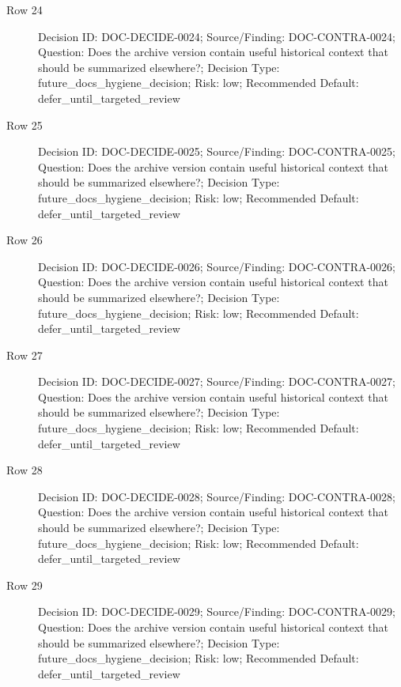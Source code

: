 \documentclass[9pt,a4paper,openany]{book}
\begin{document}
\begin{description}
\item[Row 24] Decision ID: DOC-\allowbreak{}DECIDE-\allowbreak{}0024; Source/\allowbreak{}Finding: DOC-\allowbreak{}CONTRA-\allowbreak{}0024; Question: Does the archive version contain useful historical context that should be summarized elsewhere?; Decision Type: future\_\allowbreak{}docs\_\allowbreak{}hygiene\_\allowbreak{}decision; Risk: low; Recommended Default: defer\_\allowbreak{}until\_\allowbreak{}targeted\_\allowbreak{}review
\item[Row 25] Decision ID: DOC-\allowbreak{}DECIDE-\allowbreak{}0025; Source/\allowbreak{}Finding: DOC-\allowbreak{}CONTRA-\allowbreak{}0025; Question: Does the archive version contain useful historical context that should be summarized elsewhere?; Decision Type: future\_\allowbreak{}docs\_\allowbreak{}hygiene\_\allowbreak{}decision; Risk: low; Recommended Default: defer\_\allowbreak{}until\_\allowbreak{}targeted\_\allowbreak{}review
\item[Row 26] Decision ID: DOC-\allowbreak{}DECIDE-\allowbreak{}0026; Source/\allowbreak{}Finding: DOC-\allowbreak{}CONTRA-\allowbreak{}0026; Question: Does the archive version contain useful historical context that should be summarized elsewhere?; Decision Type: future\_\allowbreak{}docs\_\allowbreak{}hygiene\_\allowbreak{}decision; Risk: low; Recommended Default: defer\_\allowbreak{}until\_\allowbreak{}targeted\_\allowbreak{}review
\item[Row 27] Decision ID: DOC-\allowbreak{}DECIDE-\allowbreak{}0027; Source/\allowbreak{}Finding: DOC-\allowbreak{}CONTRA-\allowbreak{}0027; Question: Does the archive version contain useful historical context that should be summarized elsewhere?; Decision Type: future\_\allowbreak{}docs\_\allowbreak{}hygiene\_\allowbreak{}decision; Risk: low; Recommended Default: defer\_\allowbreak{}until\_\allowbreak{}targeted\_\allowbreak{}review
\item[Row 28] Decision ID: DOC-\allowbreak{}DECIDE-\allowbreak{}0028; Source/\allowbreak{}Finding: DOC-\allowbreak{}CONTRA-\allowbreak{}0028; Question: Does the archive version contain useful historical context that should be summarized elsewhere?; Decision Type: future\_\allowbreak{}docs\_\allowbreak{}hygiene\_\allowbreak{}decision; Risk: low; Recommended Default: defer\_\allowbreak{}until\_\allowbreak{}targeted\_\allowbreak{}review
\item[Row 29] Decision ID: DOC-\allowbreak{}DECIDE-\allowbreak{}0029; Source/\allowbreak{}Finding: DOC-\allowbreak{}CONTRA-\allowbreak{}0029; Question: Does the archive version contain useful historical context that should be summarized elsewhere?; Decision Type: future\_\allowbreak{}docs\_\allowbreak{}hygiene\_\allowbreak{}decision; Risk: low; Recommended Default: defer\_\allowbreak{}until\_\allowbreak{}targeted\_\allowbreak{}review

\end{description}
\end{document}
